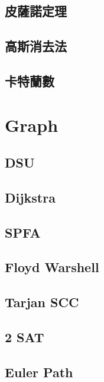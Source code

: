 \subsection{皮薩諾定理} 

\subsection{高斯消去法}

\subsection{卡特蘭數}


\section{Graph}
\subsection{DSU} 

\subsection{Dijkstra} 

\subsection{SPFA} 

\subsection{Floyd Warshell} 

\subsection{Tarjan SCC} 

\subsection{2 SAT} 

\subsection{Euler Path}

% 
